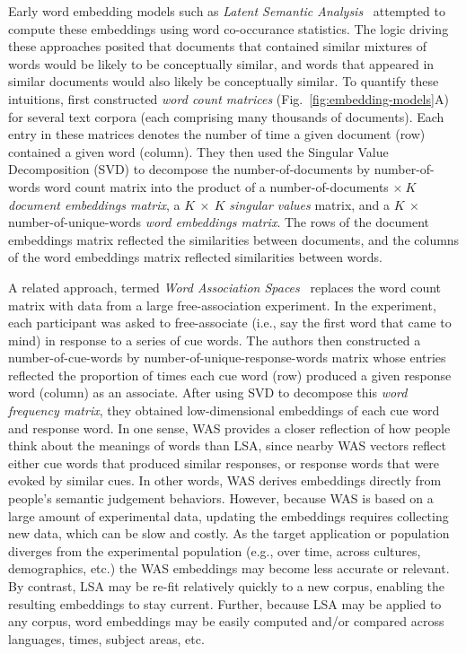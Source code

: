 \documentclass{article}
\begin{document}
Early word embedding models such as \textit{Latent Semantic Analysis}~\citep[LSA;][]{DeerEtal90, LandDuma97} attempted to compute these embeddings using word co-occurance statistics.  The logic driving these approaches posited that documents that contained similar mixtures of words would be likely to be conceptually similar, and words that appeared in similar documents would also likely be conceptually similar.  To quantify these intuitions, \cite{LandDuma97} first constructed \textit{word count matrices} (Fig.~\ref{fig:embedding-models}A) for several text corpora (each comprising many thousands of documents).  Each entry in these matrices denotes the number of time a given document (row) contained a given word (column).  They then used the Singular Value Decomposition (SVD) to decompose the number-of-documents by number-of-words word count matrix into the product of a number-of-documents $\times~K$ \textit{document embeddings matrix}, a $K~\times~K$ \textit{singular values} matrix, and a $K~\times$ number-of-unique-words \textit{word embeddings matrix}.  The rows of the document embeddings matrix reflected the similarities between documents, and the columns of the word embeddings matrix reflected similarities between words.

A related approach, termed \textit{Word Association Spaces}~\citep[WAS;][]{NelsEtal04, SteyEtal04} replaces the word count matrix with data from a large free-association experiment.  In the experiment, each participant was asked to free-associate (i.e., say the first word that came to mind) in response to a series of cue words.  The authors then constructed a number-of-cue-words by number-of-unique-response-words matrix whose entries reflected the proportion of times each cue word (row) produced a given response word (column) as an associate.  After using SVD to decompose this \textit{word frequency matrix}, they obtained low-dimensional embeddings of each cue word and response word.  In one sense, WAS provides a closer reflection of how people think about the meanings of words than LSA, since nearby WAS vectors reflect either cue words that produced similar responses, or response words that were evoked by similar cues.  In other words, WAS derives embeddings directly from people's semantic judgement behaviors.  However, because WAS is based on a large amount of experimental data, updating the embeddings requires collecting new data, which can be slow and costly.  As the target application or population diverges from the experimental population (e.g., over time, across cultures, demographics, etc.) the WAS embeddings may become less accurate or relevant.  By contrast, LSA may be re-fit relatively quickly to a new corpus, enabling the resulting embeddings to stay current.  Further, because LSA may be applied to any corpus, word embeddings may be easily computed and/or compared across languages, times, subject areas, etc.
\end{document}
